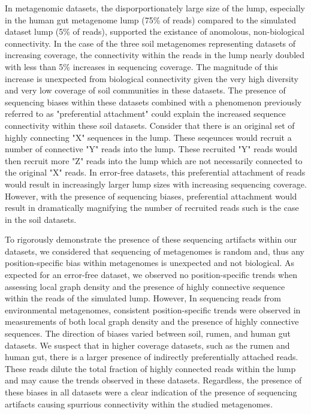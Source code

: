 \documentclass[11pt]{article} %
\begin{document}
In metagenomic datasets, the disporportionately large size of the lump, especially in the human gut metagenome lump (75\% of reads) compared to the simulated dataset lump (5\% of reads), supported the existance of anomolous, non-biological connectivity.  In the case of the three soil metagenomes representing datasets of increasing coverage, the connectivity within the reads in the lump nearly doubled with less than 5\% increases in sequencing coverage.  The magnitude of this increase is unexpected from biological connectivity given the very high diversity and very low coverage of soil communities in these datasets. The presence of sequencing biases within these datasets combined with a phenomenon previously referred to as "preferential attachment" \cite{Barabasi:1999p1083} could explain the increased sequence connectivity within these soil datasets.  Consider that there is an original set of highly connecting "X" sequences in the lump.  These seqeunces would recruit a number of connective "Y" reads into the lump.  These recruited "Y" reads would then recruit more "Z" reads into the lump which are not necessarily connected to the original "X" reads.  In error-free datasets, this preferential attachment of reads would result in increasingly larger lump sizes with increasing sequencing coverage.  However, with the presence of sequencing biases, preferential attachment would result in dramatically magnifying the number of recruited reads such is the case in the soil datasets.  

To rigorously demonstrate the presence of these sequencing artifacts within our datasets, we considered that sequencing of metagenomes is random and, thus any position-specific bias within metagenomes is unexpected and not biological.  As expected for an error-free dataset, we observed no position-specific trends when assessing local graph density and the presence of highly connective sequence within the reads of the simulated lump.  However, In sequencing reads from environmental metagenomes, consistent position-specific trends were observed in measurements of both local graph density and the presence of highly connective sequences.  The direction of biases varied between soil, rumen, and human gut datasets.  We suspect that in higher coverage datasets, such as the rumen and human gut, there is a larger presence of indirectly preferentially attached reads.  These reads dilute the total fraction of highly connected reads within the lump and may cause the trends observed in these datasets.  Regardless, the presence of these biases in all datasets were a clear indication of the presence of sequencing artifacts causing spurrious connectivity within the studied metagenomes.  
\end{document}
